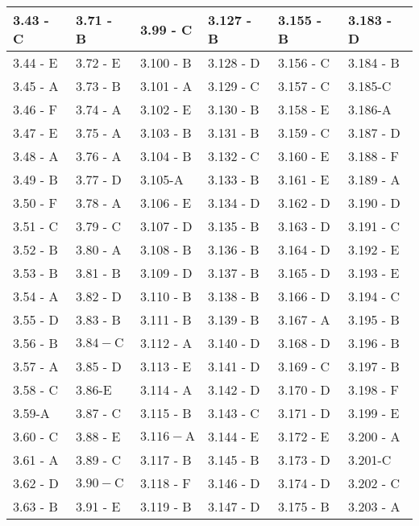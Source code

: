 \begin{center}
\begin{tabular}{|l|l|l|l|l|l|}
\hline
3.43 - C & 3.71 - B & 3.99 - C & 3.127 - B & 3.155 - B & 3.183 - D \\
\hline
3.44 - E & 3.72 - E & 3.100 - B & 3.128 - D & 3.156 - C & 3.184 - B \\
\hline
3.45 - A & 3.73 - B & 3.101 - A & 3.129 - C & 3.157 - C & 3.185-C \\
\hline
3.46 - F & 3.74 - A & 3.102 - E & 3.130 - B & 3.158 - E & 3.186-A \\
\hline
3.47 - E & 3.75 - A & 3.103 - B & 3.131 - B & 3.159 - C & 3.187 - D \\
\hline
3.48 - A & 3.76 - A & 3.104 - B & 3.132 - C & 3.160 - E & 3.188 - F \\
\hline
3.49 - B & 3.77 - D & 3.105-A & 3.133 - B & 3.161 - E & 3.189 - A \\
\hline
3.50 - F & 3.78 - A & 3.106 - E & 3.134 - D & 3.162 - D & 3.190 - D \\
\hline
3.51 - C & 3.79 - C & 3.107 - D & 3.135 - B & 3.163 - D & 3.191 - C \\
\hline
3.52 - B & 3.80 - A & 3.108 - B & 3.136 - B & 3.164 - D & 3.192 - E \\
\hline
3.53 - B & 3.81 - B & 3.109 - D & 3.137 - B & 3.165 - D & 3.193 - E \\
\hline
3.54 - A & 3.82 - D & 3.110 - B & 3.138 - B & 3.166 - D & 3.194 - C \\
\hline
3.55 - D & 3.83 - B & 3.111 - B & 3.139 - B & 3.167 - A & 3.195 - B \\
\hline
3.56 - B & $3.84-\mathrm{C}$ & 3.112 - A & 3.140 - D & 3.168 - D & 3.196 - B \\
\hline
3.57 - A & 3.85 - D & 3.113 - E & 3.141 - D & 3.169 - C & 3.197 - B \\
\hline
3.58 - C & 3.86-E & 3.114 - A & 3.142 - D & 3.170 - D & 3.198 - F \\
\hline
3.59-A & 3.87 - C & 3.115 - B & 3.143 - C & 3.171 - D & 3.199 - E \\
\hline
3.60 - C & 3.88 - E & $3.116-\mathrm{A}$ & 3.144 - E & 3.172 - E & 3.200 - A \\
\hline
3.61 - A & 3.89 - C & 3.117 - B & 3.145 - B & 3.173 - D & 3.201-C \\
\hline
3.62 - D & $3.90-\mathrm{C}$ & 3.118 - F & 3.146 - D & 3.174 - D & 3.202 - C \\
\hline
3.63 - B & 3.91 - E & 3.119 - B & 3.147 - D & 3.175 - B & 3.203 - A \\

\end{tabular}
\end{center}
